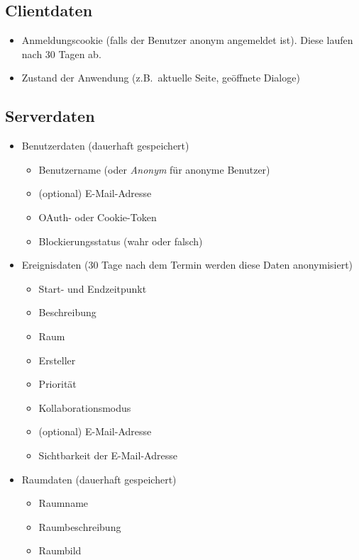 
\subsection*{Clientdaten}
\begin{itemize}
    \item Anmeldungscookie (falls der Benutzer anonym angemeldet ist).
          Diese laufen nach 30 Tagen ab.
    \item Zustand der Anwendung (z.B.\ aktuelle Seite, geöffnete Dialoge)
\end{itemize}

\subsection*{Serverdaten}
\begin{itemize}
    \item Benutzerdaten (dauerhaft gespeichert) 
    \begin{itemize}
        \item Benutzername (oder \textit{Anonym} für anonyme Benutzer)
        \item (optional) E-Mail-Adresse
        \item OAuth- oder Cookie-Token
        \item Blockierungsstatus (wahr oder falsch) 
    \end{itemize}
    \item Ereignisdaten (30 Tage nach dem Termin werden diese Daten anonymisiert)
    \begin{itemize}
        \item Start- und Endzeitpunkt 
        \item Beschreibung
        \item Raum
        \item Ersteller
        \item Priorität
        \item Kollaborationsmodus
        \item (optional) E-Mail-Adresse
        \item Sichtbarkeit der E-Mail-Adresse
    \end{itemize}
    \item Raumdaten (dauerhaft gespeichert)
    \begin{itemize}
        \item Raumname
        \item Raumbeschreibung
        \item Raumbild
    \end{itemize}
\end{itemize}
